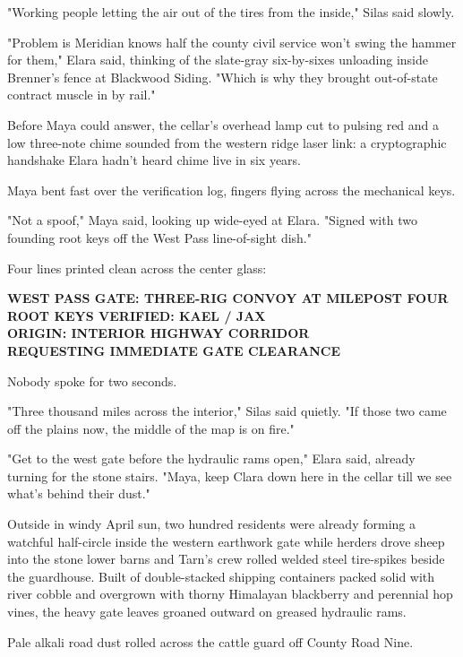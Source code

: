 "Working people letting the air out of the tires from the inside," Silas said slowly.

"Problem is Meridian knows half the county civil service won't swing the hammer for them," Elara said, thinking of the slate-gray six-by-sixes unloading inside Brenner's fence at Blackwood Siding. "Which is why they brought out-of-state contract muscle in by rail."

Before Maya could answer, the cellar's overhead lamp cut to pulsing red and a low three-note chime sounded from the western ridge laser link: a cryptographic handshake Elara hadn't heard chime live in six years.

Maya bent fast over the verification log, fingers flying across the mechanical keys.

"Not a spoof," Maya said, looking up wide-eyed at Elara. "Signed with two founding root keys off the West Pass line-of-sight dish."

Four lines printed clean across the center glass:

\begin{center}
\textbf{WEST PASS GATE: THREE-RIG CONVOY AT MILEPOST FOUR}\\
\textbf{ROOT KEYS VERIFIED: KAEL / JAX}\\
\textbf{ORIGIN: INTERIOR HIGHWAY CORRIDOR}\\
\textbf{REQUESTING IMMEDIATE GATE CLEARANCE}
\end{center}

Nobody spoke for two seconds.

"Three thousand miles across the interior," Silas said quietly. "If those two came off the plains now, the middle of the map is on fire."

"Get to the west gate before the hydraulic rams open," Elara said, already turning for the stone stairs. "Maya, keep Clara down here in the cellar till we see what's behind their dust."

Outside in windy April sun, two hundred residents were already forming a watchful half-circle inside the western earthwork gate while herders drove sheep into the stone lower barns and Tarn's crew rolled welded steel tire-spikes beside the guardhouse. Built of double-stacked shipping containers packed solid with river cobble and overgrown with thorny Himalayan blackberry and perennial hop vines, the heavy gate leaves groaned outward on greased hydraulic rams.

Pale alkali road dust rolled across the cattle guard off County Road Nine.

